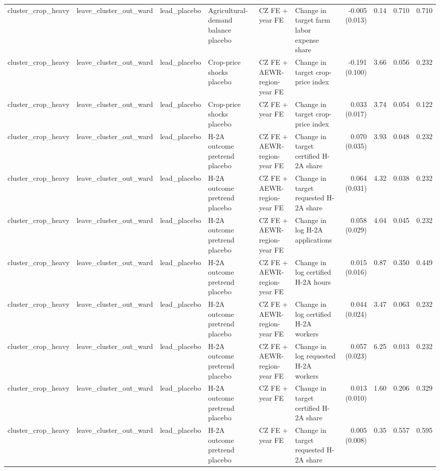 \begin{tabular}{llllllrrrr}
cluster_crop_heavy & leave_cluster_out_ward & lead_placebo & Agricultural-demand balance placebo & CZ FE + year FE & Change in target farm labor expense share & -0.005 (0.013) & 0.14 & 0.710 & 0.710 \\
cluster_crop_heavy & leave_cluster_out_ward & lead_placebo & Crop-price shocks placebo & CZ FE + AEWR-region-year FE & Change in target crop-price index & -0.191 (0.100) & 3.66 & 0.056 & 0.232 \\
cluster_crop_heavy & leave_cluster_out_ward & lead_placebo & Crop-price shocks placebo & CZ FE + year FE & Change in target crop-price index & 0.033 (0.017) & 3.74 & 0.054 & 0.122 \\
cluster_crop_heavy & leave_cluster_out_ward & lead_placebo & H-2A outcome pretrend placebo & CZ FE + AEWR-region-year FE & Change in target certified H-2A share & 0.070 (0.035) & 3.93 & 0.048 & 0.232 \\
cluster_crop_heavy & leave_cluster_out_ward & lead_placebo & H-2A outcome pretrend placebo & CZ FE + AEWR-region-year FE & Change in target requested H-2A share & 0.064 (0.031) & 4.32 & 0.038 & 0.232 \\
cluster_crop_heavy & leave_cluster_out_ward & lead_placebo & H-2A outcome pretrend placebo & CZ FE + AEWR-region-year FE & Change in log H-2A applications & 0.058 (0.029) & 4.04 & 0.045 & 0.232 \\
cluster_crop_heavy & leave_cluster_out_ward & lead_placebo & H-2A outcome pretrend placebo & CZ FE + AEWR-region-year FE & Change in log certified H-2A hours & 0.015 (0.016) & 0.87 & 0.350 & 0.449 \\
cluster_crop_heavy & leave_cluster_out_ward & lead_placebo & H-2A outcome pretrend placebo & CZ FE + AEWR-region-year FE & Change in log certified H-2A workers & 0.044 (0.024) & 3.47 & 0.063 & 0.232 \\
cluster_crop_heavy & leave_cluster_out_ward & lead_placebo & H-2A outcome pretrend placebo & CZ FE + AEWR-region-year FE & Change in log requested H-2A workers & 0.057 (0.023) & 6.25 & 0.013 & 0.232 \\
cluster_crop_heavy & leave_cluster_out_ward & lead_placebo & H-2A outcome pretrend placebo & CZ FE + year FE & Change in target certified H-2A share & 0.013 (0.010) & 1.60 & 0.206 & 0.329 \\
cluster_crop_heavy & leave_cluster_out_ward & lead_placebo & H-2A outcome pretrend placebo & CZ FE + year FE & Change in target requested H-2A share & 0.005 (0.008) & 0.35 & 0.557 & 0.595 \\

\end{tabular}
